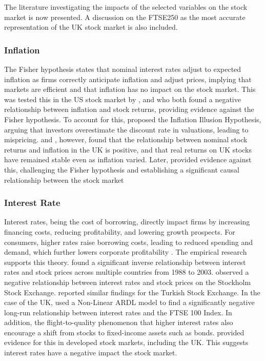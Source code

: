 \documentclass[11pt,a4paper]{article}
\newcommand{\citeboth}[1]{\citeauthor{#1} \citep{#1}}
\begin{document}
The literature investigating the impacts of the selected variables on the stock market is now presented. A discussion on the FTSE250 as the most accurate representation of the UK stock market is also included.

\subsubsection{Inflation}

The Fisher hypothesis states that nominal interest rates adjust to expected 
inflation as firms correctly anticipate inflation 
and adjust prices, implying that markets are efficient and that inflation has no impact on the stock market. This was tested this in the US stock market by \citeboth{jaffe1976}, and
\citeboth{bodie1976} who both found a negative relationship between inflation and stock returns, providing evidence against the Fisher hypothesis.
To account for this,
\citeboth{mogdiliani1979} proposed the Inflation Illusion Hypothesis, 
arguing that investors overestimate the discount rate in valuations, leading to mispricing. 
\citeboth{gultekin1983} and \citeboth{firth1979}, however, found that the relationship between nominal stock returns and inflation in the UK is positive, and that real returns on UK stocks have remained stable even as inflation varied.
Later, \citeboth{hasan2008} provided evidence against this, challenging the Fisher hypothesis and establishing a 
significant causal relationship between the stock market 


\subsubsection{Interest Rate}

Interest rates, being the cost of borrowing, directly impact firms by increasing financing costs, reducing profitability, and lowering growth prospects. For consumers, higher rates raise borrowing costs, leading to reduced spending and demand, which further lowers corporate profitability \citep{boe199section}. 
The empirical research supports this theory. \citeboth{alam2009} found a significant inverse relationship between interest rates and stock prices across multiple countries from 1988 to 2003.
\citeboth{talla2013} observed a negative relationship between interest rates and stock prices on the Stockholm Stock Exchange.
\citeboth{demir2019} reported similar findings for the Turkish Stock Exchange. In the case of the UK, \citeboth{neifar2023} used a Non-Linear ARDL model to find a significantly negative long-run relationship between interest rates and the FTSE 100 Index. 
In addition, the flight-to-quality phenomenon that higher interest rates also encourage a shift from stocks to fixed-income 
assets such as bonds. \citeboth{asgharian2016} provided evidence for this in developed stock markets, including the UK. This suggests interest rates 
have a negative impact the stock market.
\end{document}
